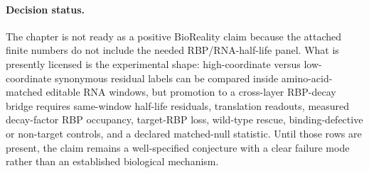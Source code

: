 \paragraph{Decision status.}
The chapter is not ready as a positive BioReality claim because the attached finite numbers do not include the needed RBP/RNA-half-life panel.  What is presently licensed is the experimental shape: high-coordinate versus low-coordinate synonymous residual labels can be compared inside amino-acid-matched editable RNA windows, but promotion to a cross-layer RBP-decay bridge requires same-window half-life residuals, translation readouts, measured decay-factor RBP occupancy, target-RBP loss, wild-type rescue, binding-defective or non-target controls, and a declared matched-null statistic.  Until those rows are present, the claim remains a well-specified conjecture with a clear failure mode rather than an established biological mechanism.

